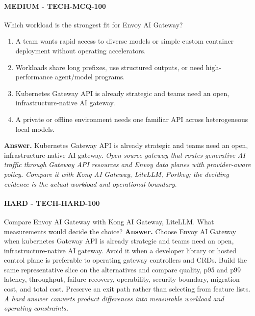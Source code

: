 \paragraph{MEDIUM - TECH-MCQ-100} Which workload is the strongest fit for Envoy AI Gateway?
\begin{enumerate}[label=\Alph*.]
\item A team wants rapid access to diverse models or simple custom container deployment without operating accelerators.
\item Workloads share long prefixes, use structured outputs, or need high-performance agent/model programs.
\item Kubernetes Gateway API is already strategic and teams need an open, infrastructure-native AI gateway.
\item A private or offline environment needs one familiar API across heterogeneous local models.
\end{enumerate}
\textbf{Answer.} Kubernetes Gateway API is already strategic and teams need an open, infrastructure-native AI gateway.
\textit{Open source gateway that routes generative AI traffic through Gateway API resources and Envoy data planes with provider-aware policy. Compare it with Kong AI Gateway, LiteLLM, Portkey; the deciding evidence is the actual workload and operational boundary.}
\paragraph{HARD - TECH-HARD-100} Compare Envoy AI Gateway with Kong AI Gateway, LiteLLM. What measurements would decide the choice?
\textbf{Answer.} Choose Envoy AI Gateway when kubernetes Gateway API is already strategic and teams need an open, infrastructure-native AI gateway. Avoid it when a developer library or hosted control plane is preferable to operating gateway controllers and CRDs. Build the same representative slice on the alternatives and compare quality, p95 and p99 latency, throughput, failure recovery, operability, security boundary, migration cost, and total cost. Preserve an exit path rather than selecting from feature lists.
\textit{A hard answer converts product differences into measurable workload and operating constraints.}
